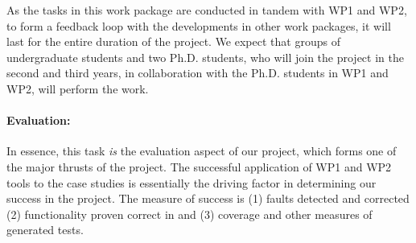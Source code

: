 As the tasks in this work package are conducted in tandem with WP1 and WP2, to form a feedback loop with the developments in other work packages, it will last for the entire duration of the project.
We expect that groups of undergraduate students and two
Ph.D. students, who will join the project in the second and third
years, in collaboration with the Ph.D. students in WP1 and WP2, will
perform the work.

\paragraph{Evaluation:} In essence, this task \emph{is} the evaluation
aspect of our project, which forms one of the major thrusts of
the project.  The successful application of WP1 and WP2 tools to the case studies is
essentially the driving factor in determining our success in the
project.
The measure of success is (1) faults detected and corrected (2) functionality
proven correct in \framac and (3) coverage and other measures
of generated tests.


